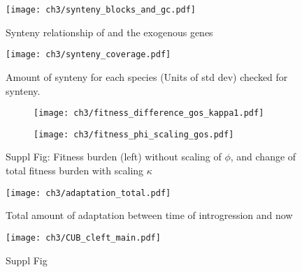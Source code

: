 \begin{figure}[H]
     \centering
	\texttt{[image: ch3/synteny\_blocks\_and\_gc.pdf]}
	\caption{Synteny relationship of \gossypii and the exogenous genes}
	\label{fig:synt_rel}
\end{figure}


\begin{figure}[H]
     \centering
	\texttt{[image: ch3/synteny\_coverage.pdf]}
	\caption{Amount of synteny for each species (Units of std dev) checked for synteny.}
	\label{fig:synteny_species}
\end{figure}



\begin{figure}[h]
    \centering
    \begin{subfigure}
        \centering
        \texttt{[image: ch3/fitness\_difference\_gos\_kappa1.pdf]}
    \end{subfigure}
    \begin{subfigure}
        \centering
        \texttt{[image: ch3/fitness\_phi\_scaling\_gos.pdf]}
    \end{subfigure}
    \caption{Suppl Fig: Fitness burden (left) without scaling of $\phi$, and change of total fitness burden with scaling $\kappa$}
    \label{fig:sne_scaling}
\end{figure}

\begin{figure}[H]
     \centering
	\texttt{[image: ch3/adaptation\_total.pdf]}
	\caption{Total amount of adaptation between time of introgression and now}
	\label{fig:adapt_tot}
\end{figure}

\clearpage
\begin{figure}[H]
     \centering
	\texttt{[image: ch3/CUB\_cleft\_main.pdf]}
	\caption{Suppl Fig}
	\label{fig:cub_all_sets}
\end{figure}


